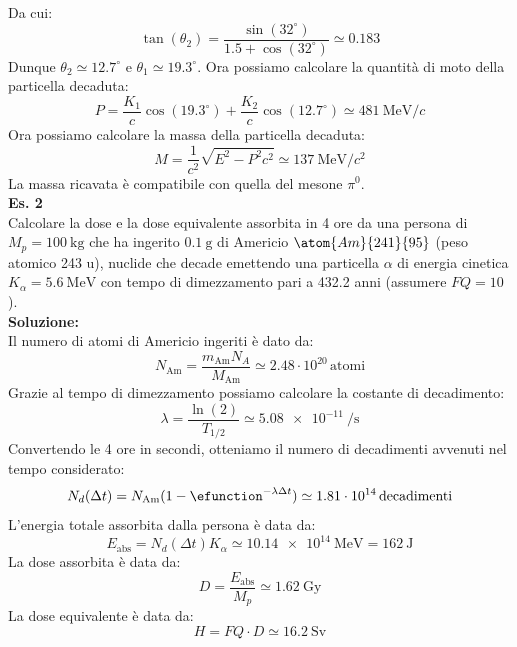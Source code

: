 Da cui:
\begin{equation}
    \tan(\theta_2) = \dfrac{\sin(32^\circ)}{1.5 + \cos(32^\circ)} \simeq 0.183
\end{equation}
Dunque $\theta_2 \simeq 12.7^\circ$ e $\theta_1 \simeq 19.3^\circ$. Ora possiamo calcolare la quantità di moto della particella decaduta:
\begin{equation}
    P = \dfrac{K_{1}}{c} \cos(19.3^\circ) + \dfrac{K_{2}}{c} \cos(12.7^\circ) \simeq \qty{481}{\mega\electronvolt\per c}
\end{equation}
Ora possiamo calcolare la massa della particella decaduta:
\begin{equation}
    M = \dfrac{1}{c^2} \sqrt{E^2 - P^2 c^2} \simeq \qty{137}{\mega\electronvolt\per c^2}
\end{equation}
La massa ricavata è compatibile con quella del mesone $\pi^0$.\\
\textbf{Es. 2}\\
Calcolare la dose e la dose equivalente assorbita in 4 ore da una persona di $M_p = \qty{100}{\kilo\gram}$ che ha ingerito $\qty{0.1}{\gram}$ di Americio $\atom{Am}{241}{95}$ (peso atomico 243 u), nuclide che decade emettendo una particella $\alpha$ di energia cinetica $K_\alpha = \qty{5.6}{\mega\electronvolt}$ con tempo di dimezzamento pari a 432.2 anni (assumere $FQ=10$).\\
\textbf{Soluzione:}\\
Il numero di atomi di Americio ingeriti è dato da:
\begin{equation}
    N_{\text{Am}} = \dfrac{m_{\text{Am}} N_A}{M_{\text{Am}}} \simeq 2.48 \cdot 10^{20}\,\text{atomi}
\end{equation}
Grazie al tempo di dimezzamento possiamo calcolare la costante di decadimento:
\begin{equation}
    \lambda = \dfrac{\ln(2)}{T_{1/2}} \simeq \qty{5.08e-11}{\per\second}
\end{equation}
Convertendo le 4 ore in secondi, otteniamo il numero di decadimenti avvenuti nel tempo considerato:
\begin{equation}
    N_d(\Delta t) = N_{\text{Am}} (1 - \efunction^{-\lambda \Delta t}) \simeq 1.81 \cdot 10^{14}\,\text{decadimenti}
\end{equation}
L'energia totale assorbita dalla persona è data da:
\begin{equation}
    E_{\text{abs}} = N_d(\Delta t) K_\alpha \simeq \qty{10.14e14}{\mega\electronvolt} = \qty{162}{\joule}
\end{equation}
La dose assorbita è data da:
\begin{equation}
    D = \dfrac{E_{\text{abs}}}{M_p} \simeq \qty{1.62}{\gray}
\end{equation}
La dose equivalente è data da:
\begin{equation}
    H = FQ \cdot D \simeq \qty{16.2}{\sievert}
\end{equation}
